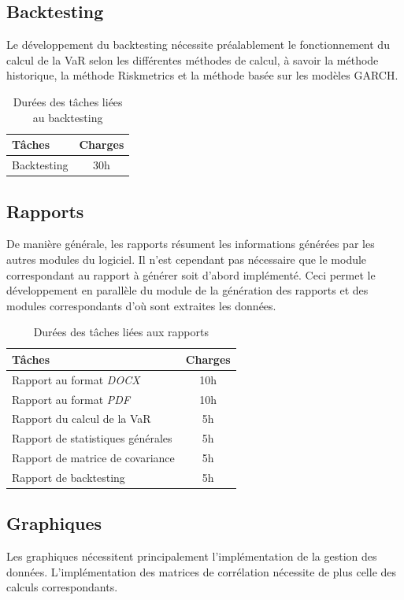 \documentclass[a4paper]{report}
\begin{document}
\subsection{Backtesting}
Le développement du backtesting nécessite préalablement le fonctionnement du calcul de la VaR selon les différentes méthodes de calcul, à savoir la méthode historique, la méthode Riskmetrics et la méthode basée sur les modèles GARCH.

\begin{table}[H]
\centering
  \begin{tabularx}{0.8\textwidth}{| X | c |}
    \hline
	Tâches & Charges \\
    \hline
    Backtesting &  30h \\
    \hline
  \end{tabularx}
  \caption{Durées des tâches liées au backtesting}
\end{table}


\subsection{Rapports}
De manière générale, les rapports résument les informations générées par les autres modules du logiciel. Il n'est cependant pas nécessaire que le module correspondant au rapport à générer soit d'abord implémenté. Ceci permet le développement en parallèle du module de la génération des rapports et des modules correspondants d'où sont extraites les données.

\begin{table}[H]
\centering
  \begin{tabularx}{0.8\textwidth}{| X | c |}
    \hline
	Tâches & Charges \\
    \hline
    Rapport au format \emph{DOCX} &  10h \\
    Rapport au format \emph{PDF} &  10h \\
    Rapport du calcul de la VaR & 5h \\
    Rapport de statistiques générales & 5h \\
    Rapport de matrice de covariance & 5h \\
    Rapport de backtesting & 5h \\
    \hline
  \end{tabularx}
  \caption{Durées des tâches liées aux rapports}
\end{table}


\subsection{Graphiques}
Les graphiques nécessitent principalement l'implémentation de la gestion des données. L'implémentation des matrices de corrélation nécessite de plus celle des calculs correspondants.
\end{document}
